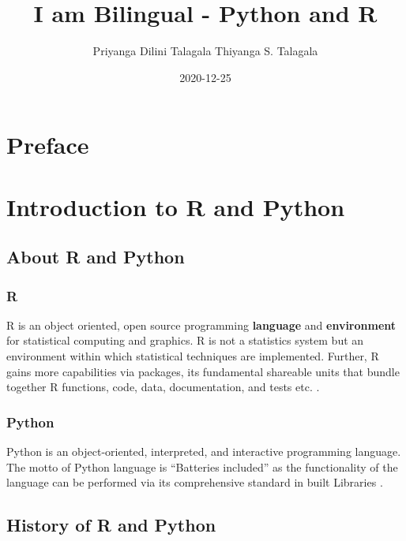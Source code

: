 \documentclass[]{book}
\title{I am Bilingual - Python and R}
\author{Priyanga Dilini Talagala Thiyanga S. Talagala}
\date{2020-12-25}
\begin{document}
\maketitle

{
\setcounter{tocdepth}{1}
\tableofcontents
}
\hypertarget{preface}{%
\chapter*{Preface}\label{preface}}

\hypertarget{intro}{%
\chapter{Introduction to R and Python}\label{intro}}

\hypertarget{about-r-and-python}{%
\section{About R and Python}\label{about-r-and-python}}

\hypertarget{r}{%
\subsection{R}\label{r}}

R is an object oriented, open source programming \textbf{language} and \textbf{environment} for statistical computing and graphics. R is not a statistics system but an environment within which statistical techniques are implemented. Further, R gains more capabilities via packages, its fundamental shareable units that bundle together R functions, code, data, documentation, and tests etc. \citep{Rcoreteam2020}.

\hypertarget{python}{%
\subsection{Python}\label{python}}

Python is an object-oriented, interpreted, and interactive programming language. The motto of Python language is ``Batteries included'' as the functionality of the language can be performed via its comprehensive standard in built Libraries \citep{wikipython}.

\hypertarget{history-of-r-and-python}{%
\section{History of R and Python}\label{history-of-r-and-python}}
\end{document}
